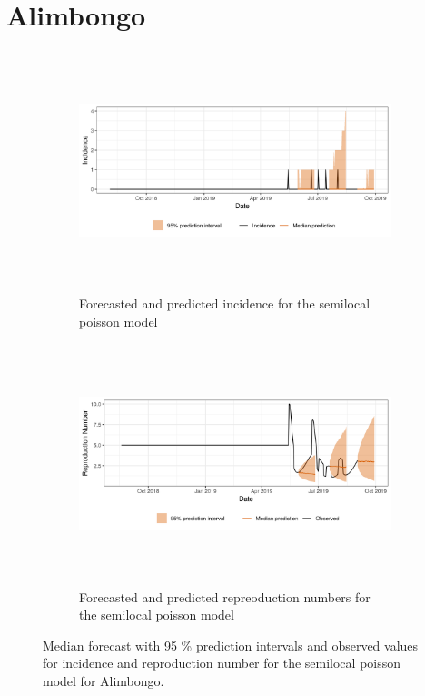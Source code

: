  \section{ Alimbongo }\begin{figure}[H]\begin{subfigure}{\textwidth}  \centering  \includegraphics[width=0.9\linewidth, height=7cm]{../output/Alimbongo_predictions.png}  \caption{Forecasted and predicted incidence for the semilocal poisson model}\end{subfigure}

\begin{subfigure}{\textwidth}  \centering  \includegraphics[width=0.9\linewidth, height=7cm]{../output/Alimbongo_Rs.png}  \caption{Forecasted and predicted repreoduction numbers for the semilocal poisson model}\end{subfigure}  \caption{Median forecast with 95 \% prediction intervals and observed values for incidence and reproduction number for the semilocal poisson model for Alimbongo.}\end{figure}

